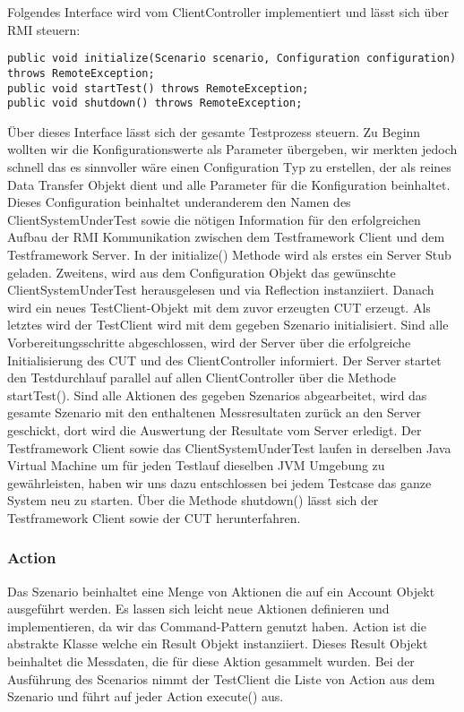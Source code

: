 Folgendes Interface wird vom ClientController implementiert und lässt sich über RMI steuern:
\begin{lstlisting}	
public void initialize(Scenario scenario, Configuration configuration) throws RemoteException;
public void startTest() throws RemoteException;
public void shutdown() throws RemoteException;
\end{lstlisting}
Über dieses Interface lässt sich der gesamte Testprozess steuern. Zu Beginn wollten wir die Konfigurationswerte als Parameter übergeben, wir merkten jedoch schnell das es sinnvoller wäre einen Configuration Typ zu erstellen, der als reines Data Transfer Objekt dient und alle Parameter für die Konfiguration beinhaltet. Dieses Configuration beinhaltet underanderem den Namen des ClientSystemUnderTest sowie die nötigen Information für den erfolgreichen Aufbau der RMI Kommunikation zwischen dem Testframework Client und dem Testframework Server. In der initialize() Methode wird als erstes ein Server Stub geladen. Zweitens, wird aus dem Configuration Objekt das gewünschte ClientSystemUnderTest herausgelesen und via Reflection instanziiert. Danach wird ein neues TestClient-Objekt mit dem zuvor erzeugten CUT erzeugt. Als letztes wird der TestClient wird mit dem gegeben Szenario initialisiert. Sind alle Vorbereitungsschritte abgeschlossen, wird der Server über die erfolgreiche Initialisierung des CUT und des ClientController informiert. Der Server startet den Testdurchlauf parallel auf allen ClientController über die Methode startTest(). Sind alle Aktionen des gegeben Szenarios abgearbeitet, wird das gesamte Szenario mit den enthaltenen Messresultaten zurück an den Server geschickt, dort wird die Auswertung der Resultate vom Server erledigt. Der Testframework Client sowie das ClientSystemUnderTest laufen in derselben Java Virtual Machine um für jeden Testlauf dieselben JVM Umgebung zu gewährleisten, haben wir uns dazu entschlossen bei jedem Testcase das ganze System neu zu starten. Über die Methode shutdown() lässt sich der Testframework Client sowie der CUT herunterfahren.

\subsubsection{Action}
\label{sec:action}
Das Szenario beinhaltet eine Menge von Aktionen die auf ein Account Objekt ausgeführt werden.  Es lassen sich leicht neue Aktionen definieren und implementieren, da wir das Command-Pattern genutzt haben. Action ist die abstrakte Klasse welche ein Result Objekt instanziiert. Dieses Result Objekt beinhaltet die Messdaten, die für diese Aktion gesammelt wurden. Bei der Ausführung des Scenarios nimmt der TestClient die Liste von Action aus dem Szenario und führt auf jeder Action execute() aus.
 
